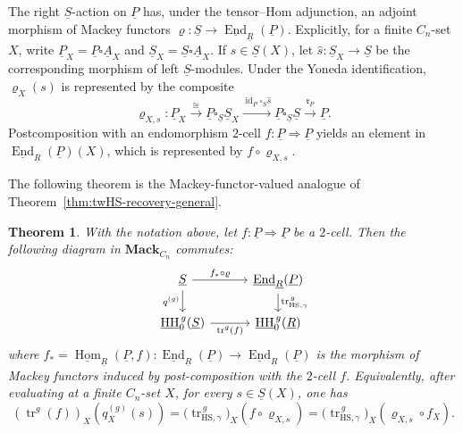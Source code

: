 \documentclass[11pt,oneside]{amsart}
\DeclareMathOperator{\Hom}{Hom}
\DeclareMathOperator{\HH}{HH}
\DeclareMathOperator{\End}{End}
\DeclareMathOperator{\id}{id}
\numberwithin{equation}{section}
\numberwithin{figure}{section}
\theoremstyle{plain}
\newtheorem{thm}{Theorem}[section]
\theoremstyle{definition}
\theoremstyle{remark}
\begin{document}
 

The right \(\underline S\)-action on \(\underline P\) has, under the
tensor--Hom adjunction, an adjoint morphism of Mackey functors
\(
\varrho\colon
\underline S\longrightarrow
\underline{\End}_{\underline R}(\underline P).
\)
Explicitly, for a finite \(C_n\)-set \(X\), write
\(\underline P_X=\underline P\square\underline A_X\) and
\(\underline S_X=\underline S\square\underline A_X\).
If \(s\in\underline S(X)\), let
\(\widehat s\colon\underline S_X\to\underline S\)
be the corresponding morphism of left \(\underline S\)-modules.
Under the Yoneda identification, \(\varrho_X(s)\) is represented by
the composite
\begin{equation}\label{eq:rhoXs-def}
\varrho_{X,s}\colon
\underline P_X
\xrightarrow{\cong}
\underline P\square_{\underline S}\underline S_X
\xrightarrow{\id_{\underline P}\square_{\underline S}\widehat s}
\underline P\square_{\underline S}\underline S
\xrightarrow{\mathfrak r_{\underline P}}
\underline P .
\end{equation}
Postcomposition with an endomorphism \(2\)-cell \(f\colon\underline P\Rightarrow\underline P\) yields an element in \(\underline{\End}_{\underline R}(\underline P)(X)\), which is represented by \(f\circ\varrho_{X,s}\).

The following theorem is the Mackey-functor-valued analogue of
Theorem~\ref{thm:twHS-recovery-general}.

 \begin{thm}\label{thm:tw-eq-bicat-vs-HS}
With the notation above, let $f\colon \underline P\Rightarrow \underline P$ be a $2$-cell. Then the following diagram in $\mathbf{Mack}_{C_n}$ commutes:
\[
\begin{tikzcd}[column sep=3em, row sep=1.5em]
\underline S
\arrow[r,"f_*\circ\varrho"]
\arrow[d,"q^{(g)}"']
&
\underline{\End}_{\underline R}(\underline P)
\arrow[d,"\operatorname{tr}_{\mathrm{HS},\gamma}^{\,g}"]\\
\underline{\HH}_0^{\,g}(\underline S) \arrow[r, "\operatorname{tr}^g(f)"'] & \underline{\HH}_0^{\,g}(\underline R)
\end{tikzcd}
\]
where $f_*=\underline{\Hom}_{\underline R}(\underline P,f) \colon \underline{\operatorname{End}}_{\underline{R}}(\underline{P}) \longrightarrow \underline{\operatorname{End}}_{\underline{R}}(\underline{P})$ is the morphism of Mackey functors induced by post-composition with the $2$-cell $f$.
Equivalently, after evaluating at a finite $C_n$-set $X$, for every $s\in\underline S(X)$, one has
\[
(\operatorname{tr}^g(f))_X(q_X^{(g)}(s))
=
\bigl(\operatorname{tr}_{\mathrm{HS},\gamma}^{\,g}\bigr)_X
(f\circ\varrho_{X,s})
=
\bigl(\operatorname{tr}_{\mathrm{HS},\gamma}^{\,g}\bigr)_X
(\varrho_{X,s}\circ f_X).
\]
\end{thm}
\end{document}
